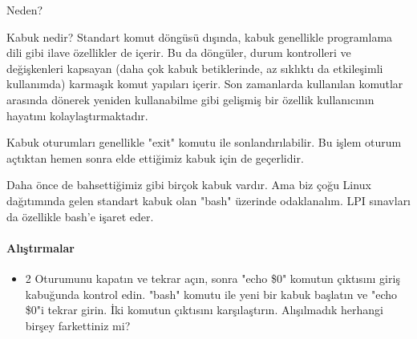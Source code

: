 \begin{section}{Neden?}
\begin{subsection}{Kabuk nedir?}
Standart komut döngüsü dışında, kabuk genellikle programlama dili gibi ilave özellikler de içerir. Bu da döngüler, durum kontrolleri ve değişkenleri kapsayan (daha çok kabuk betiklerinde, az sıklıktı da etkileşimli kullanımda) karmaşık komut yapıları içerir. Son zamanlarda kullanılan komutlar arasında dönerek yeniden kullanabilme gibi gelişmiş bir özellik kullanıcının hayatını kolaylaştırmaktadır.

Kabuk oturumları genellikle "exit" komutu ile sonlandırılabilir. Bu işlem oturum açtıktan hemen sonra elde ettiğimiz kabuk için de geçerlidir.

Daha önce de bahsettiğimiz gibi birçok kabuk vardır. Ama biz çoğu Linux dağıtımında gelen standart kabuk olan "bash" üzerinde odaklanalım. LPI sınavları da özellikle bash'e işaret eder.
\paragraph{Alıştırmalar}{
\begin{itemize}
 \item 2 Oturumunu kapatın ve tekrar açın, sonra "echo \$0" komutun çıktısını giriş kabuğunda kontrol edin. "bash" komutu ile yeni bir kabuk başlatın ve "echo \$0"i tekrar girin. İki komutun çıktısını karşılaştırın. Alışılmadık herhangi birşey farkettiniz mi?
\end{itemize}}
\end{subsection}
\end{section}
